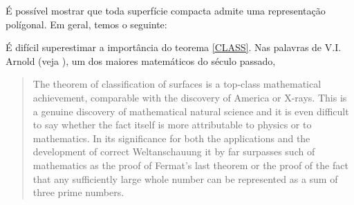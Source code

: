 \begin{itemize}
\iffalse
\begin{figure}[H]
\centering
\texttt{[image: RepDaEsfera.png]}
\caption{a representação poligonal da esfera $\mathbb{S}^2$}
\end{figure}

\begin{figure}[H]
\centering
\texttt{[image: bitoro.png]}
\caption{a representação poligonal do bitoro $\mathbb{T}^2 \sharp \mathbb{T}^2$}
\end{figure}
\vspace{1cm}
\begin{figure}[H]
\centering
\texttt{[image: projetivo.png]}
\caption{representações poligonais do plano projetivo $\mathbb{R}\mathbb{P}^2$}
\end{figure}
\fi
\end{itemize}
É possível mostrar que toda superfície compacta admite uma representação polígonal.  Em geral, temos o seguinte:
É difícil superestimar a importância do teorema \cref{CLASS}. Nas palavras de V.I. Arnold (veja ), um dos maiores matemáticos do século passado,
\blockquote{The theorem of classification of surfaces is a top-class mathematical achievement, comparable with the discovery of America or X-rays. This is a genuine discovery of mathematical natural science and it is even difficult to say whether the fact itself is more attributable to physics or to mathematics. In its significance for both the applications and the development of correct Weltanschauung it by far surpasses such  of mathematics as the proof of Fermat's last theorem or the proof of the fact that any sufficiently large whole number can be represented as a sum of three prime numbers.}

